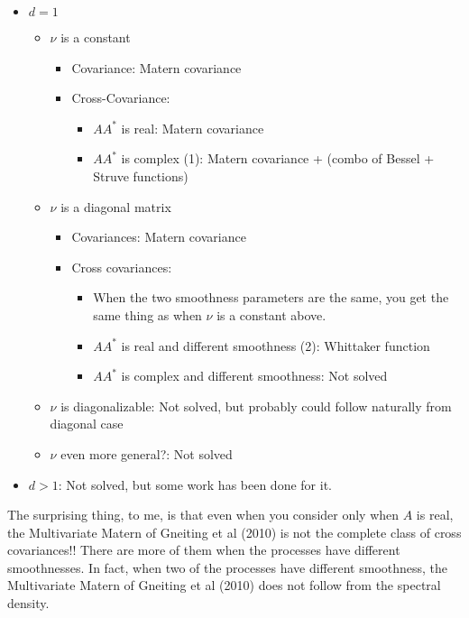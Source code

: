 \documentclass[11pt]{article}
\begin{document}
\begin{itemize}
\item $d=1$
\begin{itemize}
\item $\nu$ is a constant
\begin{itemize}
\item Covariance: Matern covariance
\item Cross-Covariance:
\begin{itemize}
\item $AA^*$ is real: Matern covariance
\item $AA^*$ is complex (1): Matern covariance + (combo of Bessel + Struve functions)
\end{itemize}
\end{itemize}
\item $\nu$ is a diagonal matrix
\begin{itemize}
\item Covariances: Matern covariance
\item Cross covariances: \begin{itemize}
\item When the two smoothness parameters are the same, you get the same thing as when $\nu$ is a constant above.
\item $AA^*$ is real and different smoothness (2): Whittaker function
\item $AA^*$ is complex and different smoothness: Not solved
\end{itemize}
\end{itemize}
\item $\nu$ is diagonalizable: Not solved, but probably could follow naturally from diagonal case
\item $\nu$ even more general?: Not solved
\end{itemize}
\item $d > 1$: Not solved, but some work has been done for it.
\end{itemize}

The surprising thing, to me, is that even when you consider only when $A$ is real, the Multivariate Matern of Gneiting et al (2010) is not the complete class of cross covariances!! There are more of them when the processes have different smoothnesses. %
In fact, when two of the processes have different smoothness, the Multivariate Matern of Gneiting et al (2010) does not follow from the spectral density.
\end{document}
